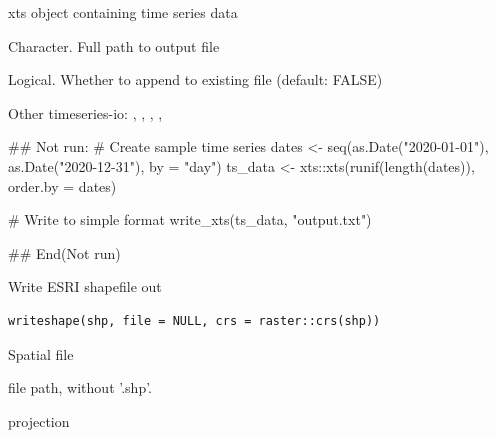 \documentclass[a4paper]{book}
\begin{document}
%
\begin{Arguments}
\begin{ldescription}
\item[\code{x}] xts object containing time series data

\item[\code{file}] Character. Full path to output file

\item[\code{append}] Logical. Whether to append to existing file (default: FALSE)
\end{ldescription}
\end{Arguments}
%
\begin{SeeAlso}\relax
Other timeseries-io: 
,
,
,
,
\end{SeeAlso}
%
\begin{Examples}
\begin{ExampleCode}
## Not run: 
# Create sample time series
dates <- seq(as.Date("2020-01-01"), as.Date("2020-12-31"), by = "day")
ts_data <- xts::xts(runif(length(dates)), order.by = dates)

# Write to simple format
write_xts(ts_data, "output.txt")

## End(Not run)
\end{ExampleCode}
\end{Examples}
%
\begin{Description}\relax
Write ESRI shapefile out
\end{Description}
%
\begin{Usage}
\begin{verbatim}
writeshape(shp, file = NULL, crs = raster::crs(shp))
\end{verbatim}
\end{Usage}
%
\begin{Arguments}
\begin{ldescription}
\item[\code{shp}] Spatial file

\item[\code{file}] file path, without '.shp'.

\item[\code{crs}] projection
\end{ldescription}
\end{Arguments}
\end{document}
